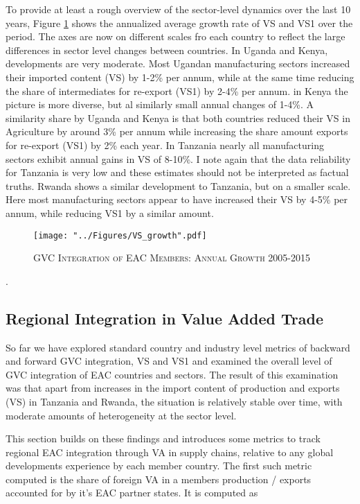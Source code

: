 \documentclass[a4paper]{article}
\begin{document}
To provide at least a rough overview of the sector-level dynamics over the last 10 years, Figure \ref{fig:VSgr} shows the annualized average growth rate of VS and VS1 over the period. The axes are now on different scales fro each country to reflect the large differences in sector level changes between countries. In Uganda and Kenya, developments are very moderate. Most Ugandan manufacturing sectors increased their imported content (VS) by 1-2\% per annum, while at the same time reducing the share of intermediates for re-export (VS1) by 2-4\% per annum. in Kenya the picture is more diverse, but al similarly small annual changes of 1-4\%. A similarity share by Uganda and Kenya is that both countries reduced their VS in Agriculture by around 3\% per annum while increasing the share amount exports for re-export (VS1) by 2\% each year. In Tanzania nearly all manufacturing sectors exhibit annual gains in VS of 8-10\%. I note again that the data reliability for Tanzania is very low and these estimates should not be interpreted as factual truths. Rwanda shows a similar development to Tanzania, but on a smaller scale. Here most manufacturing sectors appear to have increased their VS by 4-5\% per annum, while reducing VS1 by a similar amount.

\begin{figure}[h!]
\centering
\caption{\label{fig:VSgr}\textsc{GVC Integration of EAC Members: Annual Growth 2005-2015}}
\texttt{[image: "../Figures/VS\_growth".pdf]} %
\end{figure}
\FloatBarrier


.


\subsection{Regional Integration in Value Added Trade}
So far we have explored standard country and industry level metrics of backward and forward GVC integration, VS and VS1 and examined the overall level of GVC integration of EAC countries and sectors. The result of this examination was that apart from increases in the import content of production and exports (VS) in Tanzania and Rwanda, the situation is relatively stable over time, with moderate amounts of heterogeneity at the sector level. \newline

This section builds on these findings and introduces some metrics to track regional EAC integration through VA in supply chains, relative to any global developments experience by each member country. The first such metric computed is the share of foreign VA in a members production / exports accounted for by it's EAC partner states. It is computed as
\end{document}
